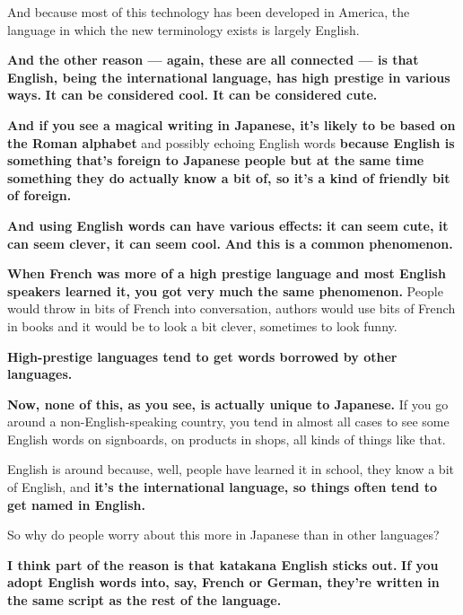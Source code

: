 And because most of this technology has been developed in America, the language in which the new terminology exists is largely English.

\thinrule

{\bf And the other reason --- again, these are all connected --- is that English, being the international language, has high prestige in various ways.} {\bf It can be considered cool. It can be considered cute.}

{}

{\bf And if you see a magical writing in Japanese, it's likely to be based on the Roman alphabet} and possibly echoing English words {\bf because English is something that's foreign to Japanese people but at the same time something they do actually know a bit of, so it's a kind of friendly bit of foreign.}

{\bf And using English words can have various effects:} {\bf it can seem cute, it can seem clever, it can seem cool.} {\bf And this is a common phenomenon.}

\thinrule

{\bf When French was more of a high prestige language and most English speakers learned it, you got very much the same phenomenon.} People would throw in bits of French into conversation, authors would use bits of French in books and it would be to look a bit clever, sometimes to look funny.

{\bf High-prestige languages tend to get words borrowed by other languages.}

\thinrule

{\bf Now, none of this, as you see, is actually unique to Japanese.} If you go around a non-English-speaking country, you tend in almost all cases to see some English words on signboards, on products in shops, all kinds of things like that.

English is around because, well, people have learned it in school, they know a bit of English, and {\bf it's the international language, so things often tend to get named in English.}

\stopsectionlevel

\startsectionlevel[title={Why do some people worry about English invading Japanese?},reference={why-do-some-people-worry-about-english-invading-japanese}]

So why do people worry about this more in Japanese than in other languages?

{\bf I think part of the reason is that katakana English sticks out.} {\bf If you adopt English words into, say, French or German, they're written in the same script as the rest of the language.}

